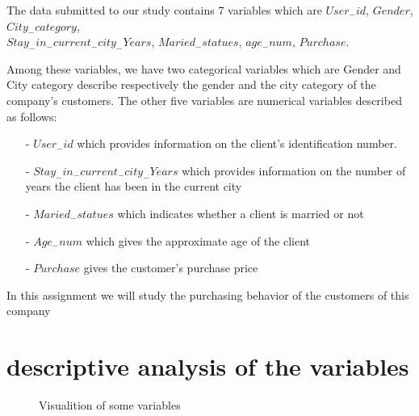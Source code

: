 \documentclass[11pt,a4paper]{article}
\begin{document}
The data submitted to our study contains 7 variables which are $User_{-}id$, $Gender$, $City_{-}category$,
\\ $Stay_{-}in_{-}current_{-}city_{-}Years$, 
$Maried_{-}statues$, $age_{-}num$, $ Purchase $.

Among these variables, we have two categorical variables which are Gender and City category  describe respectively the gender and the city category of the company's customers. The other five variables are numerical variables described as follows:

\begin{itemize}
	\item[-] $User_{-}id$ which provides information on the client's identification number.
	\item[-] $Stay_{-}in_{-}current_{-}city_{-}Years$ 
	which provides information on the number of years the client has been in the current city
	\item[-] $Maried_{-}statues$ which indicates whether a client is married or not
	
	\item[-] $Age_{-}num$ which gives the approximate age of the client
	
	\item[-] $ Purchase $ gives the customer's purchase price
\end{itemize}
In this assignment we will study the purchasing behavior of the customers of this company
	
\section{descriptive analysis of the variables}	
\begin{figure}[h!]
	\centering

	\caption{Visualition of some variables}\label{fig:trapez}
\end{figure}
\end{document}
